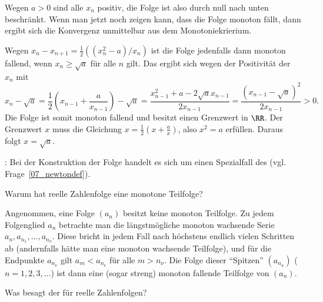 \begin{antwort}
  Wegen $a>0$ sind alle $x_n$ positiv, die Folge ist also durch null 
  nach unten beschränkt. 
  Wenn man jetzt noch zeigen kann, dass die Folge monoton fällt, dann 
  ergibt sich die Konvergenz unmittelbar aus dem Monotoniekrierium. 

  Wegen $x_n-x_{n+1} = \frac{1}{2} \left( ( x_n^2-a ) / x_n \right)$ 
  ist die Folge jedenfalls dann monoton fallend, wenn 
  $x_n \ge \sqrt{a}$ für alle $n$ gilt. Das ergibt sich wegen der 
  Positivität der $x_n$ mit 
  \[
  x_{n}-\sqrt{a} = \frac{1}{2}\left( x_{n-1} + \frac{a}{x_{n-1}} \right) 
  - \sqrt{a} 
  = \frac{ x_{n-1}^2+a-2\sqrt{a}x_{n-1} }{ 2x_{n-1} } 
  = \frac{ (x_{n-1}-\sqrt{a})^2 }{2x_{n-1}} > 0.
  \] 
  Die Folge ist somit monoton fallend und besitzt einen Grenzwert in $\RR$.
  Der Grenzwert $x$ muss die Gleichung  $x=\frac{1}{2}\left( x+\frac{a}{x} \right)$, also  $x^2=a$  
  erfüllen. Daraus folgt $x=\sqrt{a}$. 

  \medskip
  \noindent
  : Bei der Konstruktion der Folge handelt es sich um einen 
  Spezialfall des  (vgl. Frage~\ref{07_newtondef}).
  \AntEnd
\end{antwort}

\begin{frage}%
  \label{02_mont}
  Warum hat  reelle Zahlenfolge eine monotone Teilfolge?
\end{frage}

\begin{antwort}
  Angenommen, eine 
  Folge $(a_n)$ besitzt keine monoton  Teilfolge. 
  Zu jedem Folgenglied $a_n$ betrachte man die längstmögliche 
  monoton wachsende Serie $a_n, a_{n_1}, \ldots, a_{n_\nu}$. 
  Diese bricht in jedem Fall nach höchstens endlich vielen Schritten ab 
  (andernfalls hätte man eine monoton wachsende Teilfolge),  
  und für die Endpunkte $a_{n_\nu}$ gilt $a_m < a_{n_\nu}$ für alle 
  $m>n_\nu$. Die Folge dieser "`Spitzen"' $(a_{n_u})$ ($n=1,2,3,\ldots$) ist 
  dann eine (sogar streng) monoton fallende Teilfolge von $(a_n)$.
  \AntEnd
\end{antwort}

\begin{frage}%
  \label{02_bw}
  Was besagt der  für reelle Zahlenfolgen?
\end{frage}

